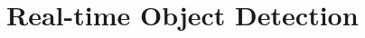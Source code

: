 \documentclass{erauthesis}
\begin{document}





\chapter{Real-time Object Detection} \label{realtime_object_detection}
% 

% 







% 
\end{document}
